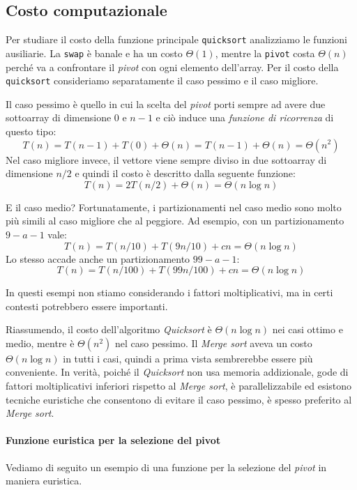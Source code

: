 \subsection{Costo computazionale}
Per studiare il costo della funzione principale \texttt{quicksort} analizziamo
le funzioni ausiliarie. La \texttt{swap} è banale e ha un costo
$\Theta(1)$, mentre la \texttt{pivot} costa $\Theta(n)$ perché va a confrontare
il \emph{pivot} con ogni elemento dell'array. Per il costo della
\texttt{quicksort} consideriamo separatamente il caso pessimo e il caso migliore.

\bigskip\noindent
Il caso pessimo è quello in cui la scelta del \emph{pivot} porti sempre ad avere
due sottoarray di dimensione $0$ e $n-1$ e ciò induce una
\emph{funzione di ricorrenza} di questo tipo:
\[T(n)=T(n-1)+T(0)+\Theta(n)=T(n-1)+\Theta(n)=\Theta(n^2)\]
Nel caso migliore invece, il vettore viene sempre diviso in due sottoarray di
dimensione $n/2$ e quindi il costo è descritto dalla seguente funzione:
\[T(n)=2T(n/2)+\Theta(n)=\Theta(n\log n)\]

\bigskip\noindent
E il caso medio?
Fortunatamente, i partizionamenti nel caso medio sono molto più simili al caso
migliore che al peggiore. Ad esempio, con un partizionamento $9-a-1$ vale:
\[T(n)=T(n/10)+T(9n/10)+cn=\Theta(n\log n)\]
Lo stesso accade anche un partizionamento $99-a-1$:
\[T(n)=T(n/100)+T(99n/100)+cn=\Theta(n\log n)\]
\begin{note}
    In questi esempi non stiamo considerando i fattori moltiplicativi, ma in
    certi contesti potrebbero essere importanti.
\end{note}\noindent
Riassumendo, il costo dell'algoritmo \emph{Quicksort} è $\Theta(n\log n)$ nei
casi ottimo e medio, mentre è $\Theta(n^2)$ nel caso pessimo. Il \emph{Merge sort}
aveva un costo $\Theta(n\log n)$ in tutti i casi, quindi a prima vista
sembrerebbe essere più conveniente. In verità, poiché il \emph{Quicksort}
non usa memoria addizionale, gode di fattori moltiplicativi inferiori rispetto al
\emph{Merge sort}, è parallelizzabile ed esistono tecniche euristiche che consentono
di evitare il caso pessimo, è spesso preferito al \emph{Merge sort}.

\paragraph{Funzione euristica per la selezione del pivot}
Vediamo di seguito un esempio di una funzione per la selezione del \emph{pivot}
in maniera euristica.

